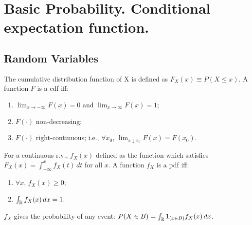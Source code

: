 \documentclass[DIV=14,titlepage=false]{scrreprt}
\begin{document}
\vspace{-10pt}
\chapter{Basic Probability. Conditional expectation function.}
\section{Random Variables}
\begin{definition}
  The cumulative distribution function of X is  defined as $ F_X(x) \equiv P(X \leq x) $. 
  A function $ F $ is a cdf iff:
  \begin{enumerate}
  \item $ \lim_{x \to -\infty} F(x) = 0 $ and $ \lim_{x \to \infty} F(x) = 1 $;
  \item $ F (\cdot) $ non-decreasing;
  \item $ F (\cdot) $ right-continuous; i.e., $ \forall x_0 $, $ \lim_{x \downarrow x_0} F(x) = F(x_0) $.
  \end{enumerate}
\end{definition}
\vspace{5pt}
\begin{definition}
  For a continuous r.v., $ f_X (x) $ defined as the function which satisfies $ F_X(x) = \int_{-\infty}^{x} f_X(t) \, dt $ for all $ x $. A function $ f_X $ is a pdf iff:
  \begin{enumerate}
  \item $ \forall x $, $ f_X(x) \geq 0 $;
  \item $ \int_{\mathbb{R}} f_X(x) \, dx = 1 $.
  \end{enumerate}
\end{definition}
\vspace{5pt}
$ f_X $ gives the probability of any event: $ P (X \in B) = \int_{\mathbb{R}} 1_{(x \in B)} f_X(x) \, dx $.
\end{document}
